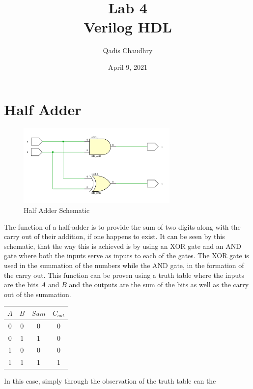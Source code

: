 \documentclass[12pt]{article}
\title{Lab 4 \\ Verilog HDL}
\author{Qadis Chaudhry}
\date{April 9, 2021}
\begin{document}
\maketitle
    \section*{Half Adder}
    \begin{figure}[h]
        \centering
        \includegraphics[width=0.7\textwidth]{Half Adder Schematic.png}
        \caption{Half Adder Schematic}
        \label{fig:Half-Adder-Schematic}
    \end{figure}
    \par The function of a half-adder is to provide the sum of two digits along
    with the carry out of their addition, if one happens to exist. It can be
    seen by this schematic, that the way this is achieved is by using an XOR
    gate and an AND gate where both the inputs serve as inputs to each of the
    gates. The XOR gate is used in the summation of the numbers while the AND
    gate, in the formation of the carry out. This function can be proven using a
    truth table where the inputs are the bits $A$ and $B$ and the outputs are
    the sum of the bits as well as the carry out of the summation.
    \begin{table}[h]
        \centering
        \begin{tabular}{cc|cc}
            \toprule
            $A$ & $B$ & $Sum$ & $C_{out}$ \\
            \midrule
            0 & 0 & 0 & 0 \\
            0 & 1 & 1 & 0 \\
            1 & 0 & 0 & 0 \\
            1 & 1 & 1 & 1 \\
            \bottomrule
        \end{tabular}
    \end{table}
    \par In this case, simply through the observation of the truth table can the
\end{document}
